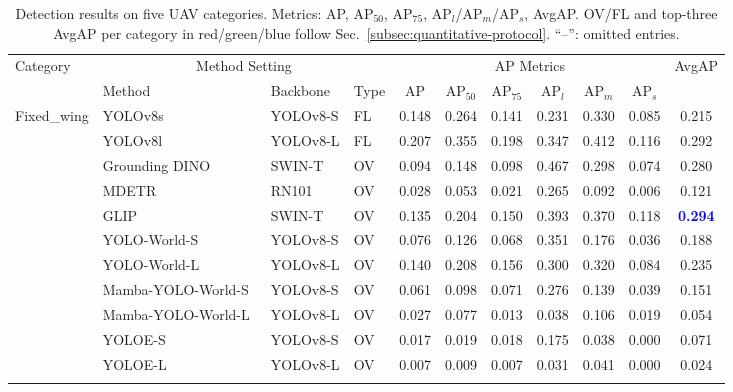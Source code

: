 \documentclass[letterpaper, 10 pt, conference]{ieeeconf}  %
\begin{document}
\clearpage
\begin{table}[!p]
\centering
\caption{Detection results on five UAV categories. Metrics: AP, AP$_{50}$, AP$_{75}$, AP$_l$/AP$_m$/AP$_s$, AvgAP. OV/FL and top-three AvgAP per category in red/green/blue follow Sec.~\ref{subsec:quantitative-protocol}. ``--'': omitted entries.}
\vspace{-8pt}
\label{tab:uav-anti-results}
\scriptsize
\renewcommand{\arraystretch}{1.2}
\setlength{\tabcolsep}{9.2pt}
\begin{tabular}{l|lll|cccccc|c}
\hline
\multirow{2}{*}{Category} & \multicolumn{3}{c|}{Method Setting} & \multicolumn{6}{c|}{AP Metrics} & \multirow{2}{*}{AvgAP} \\
\cline{2-10}
 & Method & Backbone & Type & AP & AP$_{50}$ & AP$_{75}$ & AP$_l$ & AP$_m$ & AP$_s$ &  \\
\hline
\multirow{13}{*}{Fixed\_wing} & YOLOv8s & YOLOv8-S & FL & 0.148 & 0.264 & 0.141 & 0.231 & 0.330 & 0.085 & 0.215 \\
 & YOLOv8l & YOLOv8-L & FL & 0.207 & 0.355 & 0.198 & 0.347 & 0.412 & 0.116 & 0.292 \\
\cline{2-11}
 & Grounding DINO~\cite{liu2024groundingdino} & SWIN-T & OV & 0.094 & 0.148 & 0.098 & 0.467 & 0.298 & 0.074 & 0.280 \\
 & MDETR~\cite{kamath2021mdetr} & RN101 & OV & 0.028 & 0.053 & 0.021 & 0.265 & 0.092 & 0.006 & 0.121 \\
 & GLIP~\cite{li2022glip} & SWIN-T & OV & 0.135 & 0.204 & 0.150 & 0.393 & 0.370 & 0.118 & \textbf{\textcolor{blue}{0.294}} \\
 & YOLO-World-S~\cite{cheng2024yoloworld} & YOLOv8-S & OV & 0.076 & 0.126 & 0.068 & 0.351 & 0.176 & 0.036 & 0.188 \\
 & YOLO-World-L~\cite{cheng2024yoloworld} & YOLOv8-L & OV & 0.140 & 0.208 & 0.156 & 0.300 & 0.320 & 0.084 & 0.235 \\
 & Mamba-YOLO-World-S~\cite{wang2025mambayoloworld} & YOLOv8-S & OV & 0.061 & 0.098 & 0.071 & 0.276 & 0.139 & 0.039 & 0.151 \\
 & Mamba-YOLO-World-L~\cite{wang2025mambayoloworld} & YOLOv8-L & OV & 0.027 & 0.077 & 0.013 & 0.038 & 0.106 & 0.019 & 0.054 \\
 & YOLOE-S~\cite{wang2025yoloe} & YOLOv8-S & OV & 0.017 & 0.019 & 0.018 & 0.175 & 0.038 & 0.000 & 0.071 \\
 & YOLOE-L~\cite{wang2025yoloe} & YOLOv8-L & OV & 0.007 & 0.009 & 0.007 & 0.031 & 0.041 & 0.000 & 0.024 \\
\hhline{~----------}

\end{tabular}
\end{table}
\end{document}
